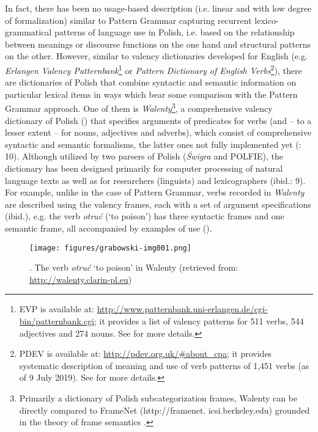 \documentclass[output=paper]{langscibook}
\begin{document}
\largerpage[-2]%
In fact, there has been no usage-based description (i.e. linear and with low degree of formalization) similar to Pattern Grammar capturing recurrent lexico-grammatical patterns of language use in Polish, i.e. based on the relationship between meanings or discourse functions on the one hand and structural patterns on the other. However, similar to valency dictionaries developed for English (e.g. \textit{Erlangen Valency Patternbank}\footnote{EVP is available at: \url{http://www.patternbank.uni-erlangen.de/cgi-bin/patternbank.cgi}; it provides a list of valency patterns for 511 verbs, 544 adjectives and 274 nouns. See \citet{HerbstEtAl2004} for more details.} or \textit{Pattern Dictionary of English Verbs}\footnote{PDEV is available at: \url{http://pdev.org.uk/\#about_cpa}; it provides systematic description of meaning and use of verb patterns of 1,451 verbs (as of 9 July 2019). See \citet{Hanks2013} for more details.}), there are dictionaries of Polish that combine syntactic and semantic information on particular lexical items in ways which bear some comparison with the Pattern Grammar approach. One of them is \textit{Walenty}\footnote{Primarily a dictionary of Polish subcategorization frames, Walenty can be directly compared to FrameNet (http://framenet. icsi.berkeley.edu) grounded in the theory of frame semantics \citep{Fillmore1982}.}, a comprehensive valency dictionary of Polish (\citealt{PrzepiórkowskiEtAl2017Phraseology,PrzepiórkowskiEtAl2017Walenty}) that specifies arguments of predicates for verbs (and -- to a lesser extent -- for nouns, adjectives and adverbs), which consist of comprehensive syntactic and semantic formalisms, the latter ones not fully implemented yet (\citealt{PrzepiórkowskiEtAl2017Phraseology}: 10). Although utilized by two parsers of Polish (\textit{Świgra} and POLFIE), the dictionary has been designed primarily for computer processing of natural language texts as well as for researchers (linguists) and lexicographers (ibid.: 9). For example, unlike in the case of Pattern Grammar, verbs recorded in \textit{Walenty} are described using the valency frames, each with a set of argument specifications (ibid.), e.g. the verb \textit{otruć} (‘to poison’) has three syntactic frames and one semantic frame, all accompanied by examples of use ().

   
\begin{figure}
\texttt{[image: figures/grabowski-img001.png]}
\caption{\label{fig:grabowski:1}. The verb \textit{otruć} ‘to poison’ in Walenty (retrieved from: \url{http://walenty.clarin-pl.eu})}
\end{figure}
\end{document}
